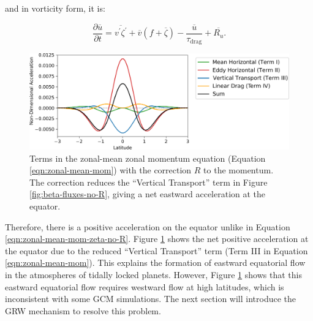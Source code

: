 and in vorticity form, it is:

\begin{equation}\label{eqn:zonal-mean-mom-zeta-no-R}
\frac{\partial \overline{u}}{\partial t}=\overline{v^{\prime} \zeta^{\prime}}+\overline{v}(f+\overline{\zeta})-\frac{\overline{u}}{\tau_{\mathrm{drag}}}+\overline{R_{u}}.
\end{equation}

\begin{figure}[t]
  \centering
  \includegraphics[width=1.0\textwidth]{figures/eqm-zonal-flow/beta-fluxes.pdf}
  \caption{Terms in the zonal-mean zonal momentum equation (Equation \ref{eqn:zonal-mean-mom}) with the correction $R$ to the momentum. The correction reduces the ``Vertical Transport'' term in Figure \ref{fig:beta-fluxes-no-R}, giving a net eastward acceleration at the equator.}
  \label{fig:beta-fluxes-with-R}
\end{figure}

Therefore, there is a positive acceleration on the equator unlike in Equation \ref{eqn:zonal-mean-mom-zeta-no-R}. Figure \ref{fig:beta-fluxes-with-R} shows the net positive acceleration at the equator due to the reduced ``Vertical Transport'' term (Term III in Equation \ref{eqn:zonal-mean-mom}). This explains the formation of eastward equatorial flow in the atmospheres of tidally locked planets. However, Figure \ref{fig:beta-fluxes-with-R} shows that this eastward equatorial flow requires westward flow at high latitudes, which is inconsistent with some GCM simulations. The next section will introduce the GRW mechanism to resolve this problem.



